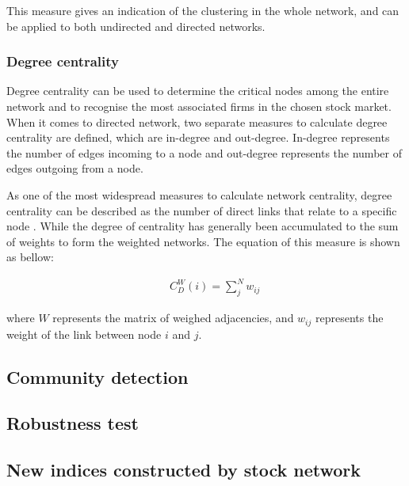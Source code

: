 This measure gives an indication of the clustering in the whole network, and can be applied to both undirected and directed networks.

\subsubsection{Degree centrality}
Degree centrality can be used to determine the critical nodes among the entire network and to recognise the most associated firms in the chosen stock market. When it comes to directed network, two separate measures to calculate degree centrality are defined, which are in-degree and out-degree. In-degree represents the number of edges incoming to a node and out-degree represents the number of edges outgoing from a node.

As one of the most widespread measures to calculate network centrality, degree centrality can be described as the number of direct links that relate to a specific node \cite{freeman}. While the degree of centrality has generally been accumulated to the sum of weights to form the weighted networks. The equation of this measure is shown as bellow:

\begin{eqnarray}
&&C_D^W(i)=\sum_{j}^{N}w_{ij}
\end{eqnarray}

where $W$ represents the matrix of weighed adjacencies, and $w_{ij}$ represents the weight of the link between node $i$ and $j$.

\subsection{Community detection}



\subsection{Robustness test}

\subsection{New indices constructed by stock network}
